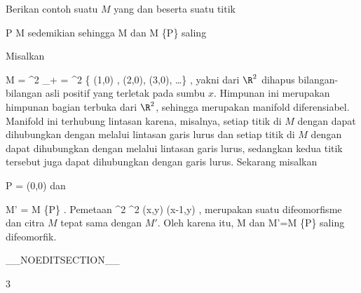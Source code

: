 {

Berikan contoh suatu
$M$ yang
dan
beserta suatu titik

\mavergleichskette
{\vergleichskette
{ P
}
{ \in }{ M
}
{  }{
}
{    }{
}
{   }{
}
}
{}{}{}
sedemikian sehingga
\mathkor {} {M} {dan} {M \setminus \{P\}} {}
saling

}
{

Misalkan

\mavergleichskettedisp
{\vergleichskette
{M
}
{ =} { \R^2 \setminus \N_+
}
{ =} { \R^2 \setminus \{ (1,0) , (2,0), (3,0), \ldots  \}
}
{ } {
}
{ } {
}
}
{}{}{,}
yakni dari $\R^2$ dihapus bilangan-bilangan asli positif yang terletak pada sumbu $x$. Himpunan ini merupakan himpunan bagian terbuka dari $\R^2$, sehingga merupakan manifold diferensiabel. Manifold ini terhubung lintasan karena, misalnya, setiap titik di $M$ dengan
 dapat dihubungkan dengan
 melalui lintasan garis lurus dan setiap titik di $M$ dengan
 dapat dihubungkan dengan
 melalui lintasan garis lurus, sedangkan kedua titik tersebut juga dapat dihubungkan dengan garis lurus. Sekarang misalkan

\mavergleichskettedisp
{\vergleichskette
{P
}
{ =} { (0,0)
}
{ } {
}
{ } {
}
{ } {
}
}
{}{}{}
dan

\mavergleichskettedisp
{\vergleichskette
{M'
}
{ =} { M \setminus \{P\}
}
{ } {
}
{ } {
}
{ } {
}
}
{}{}{.}
Pemetaan
\maabbeledisp {} {\R^2} {\R^2
} {(x,y)} {(x-1,y)
} {,}
merupakan suatu difeomorfisme
 {} {}
dan citra $M$ tepat sama dengan $M'$. Oleh karena itu,
\mathkor {} {M} {dan} {M'=M \setminus \{P\}} {}
saling difeomorfik.

 }

__NOEDITSECTION__

{3}

